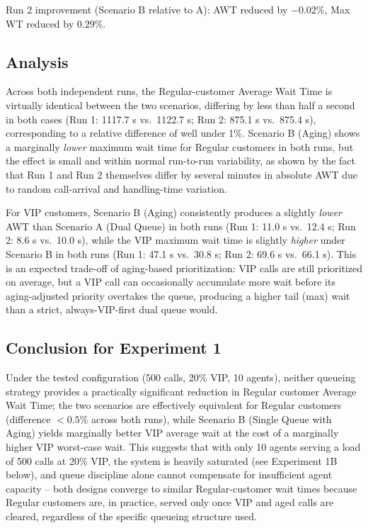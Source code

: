 \documentclass[11pt]{article}
\begin{document}
Run 2 improvement (Scenario B relative to A): AWT reduced by $-0.02\%$, Max WT reduced by $0.29\%$.

\subsection{Analysis}
Across both independent runs, the Regular-customer Average Wait Time is virtually identical between the two scenarios, differing by less than half a second in both cases (Run 1: 1117.7 s vs.\ 1122.7 s; Run 2: 875.1 s vs.\ 875.4 s), corresponding to a relative difference of well under 1\%. Scenario B (Aging) shows a marginally \emph{lower} maximum wait time for Regular customers in both runs, but the effect is small and within normal run-to-run variability, as shown by the fact that Run 1 and Run 2 themselves differ by several minutes in absolute AWT due to random call-arrival and handling-time variation.

For VIP customers, Scenario B (Aging) consistently produces a slightly \emph{lower} AWT than Scenario A (Dual Queue) in both runs (Run 1: 11.0 s vs.\ 12.4 s; Run 2: 8.6 s vs.\ 10.0 s), while the VIP maximum wait time is slightly \emph{higher} under Scenario B in both runs (Run 1: 47.1 s vs.\ 30.8 s; Run 2: 69.6 s vs.\ 66.1 s). This is an expected trade-off of aging-based prioritization: VIP calls are still prioritized on average, but a VIP call can occasionally accumulate more wait before its aging-adjusted priority overtakes the queue, producing a higher tail (max) wait than a strict, always-VIP-first dual queue would.

\subsection{Conclusion for Experiment 1}
Under the tested configuration (500 calls, 20\% VIP, 10 agents), neither queueing strategy provides a practically significant reduction in Regular customer Average Wait Time; the two scenarios are effectively equivalent for Regular customers (difference $< 0.5\%$ across both runs), while Scenario B (Single Queue with Aging) yields marginally better VIP average wait at the cost of a marginally higher VIP worst-case wait. This suggests that with only 10 agents serving a load of 500 calls at 20\% VIP, the system is heavily saturated (see Experiment 1B below), and queue discipline alone cannot compensate for insufficient agent capacity -- both designs converge to similar Regular-customer wait times because Regular customers are, in practice, served only once VIP and aged calls are cleared, regardless of the specific queueing structure used.
\end{document}
